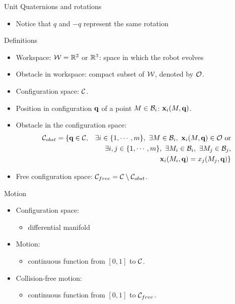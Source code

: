 %
%
\begin {frame} {Unit Quaternions and rotations}
  \begin{itemize}
    \item Notice that $q$ and $-q$ represent the same rotation
  \end{itemize}
\end{frame}

%
%

\begin{frame} {Definitions}

\begin{itemize}
\item Workspace: ${\cal W}=\mathbb{R}^2$ or $\mathbb{R}^3$: space in which the robot evolves
\pause
\item Obstacle in workspace: compact subset of ${\cal W}$, denoted by ${\cal O}$.
\pause
\item Configuration space: ${\cal C}$.
\pause
\item Position in configuration $\textbf{q}$ of a point $M\in{\cal B}_i$:
  $\textbf{x}_i(M,\textbf{q})$.
\pause
\item Obstacle in the configuration space:
\begin{eqnarray*}
{\cal C}_{obst}&=\{\textbf{q}\in{\cal C},&\exists i\in\{1,\cdots,m\},\ \exists M\in{\cal B}_i,\ \textbf{x}_i(M,\textbf{q})\in{\cal O}\ \mbox{or}\\
&&\exists i,j\in\{1,\cdots,m\},\ \exists M_i\in{\cal B}_i,\ \exists M_j\in{\cal B}_j,\\
&&\textbf{x}_i(M_i,\textbf{q})=x_j(M_j,\textbf{q})\}
\end{eqnarray*}
\pause
\item Free configuration space: ${\cal C}_{free} = {\cal C}\setminus{\cal C}_{obst}$.
\end{itemize}
\end{frame}

%
%

\begin{frame} {Motion}

\begin{itemize}
\item Configuration space:
  \begin{itemize}
  \item differential manifold
  \end{itemize}
  \pause
\item Motion:
  \begin{itemize}
  \item continuous function from $[0,1]$ to ${\cal C}$.
  \end{itemize}
  \pause
\item Collision-free motion:
  \begin{itemize}
  \item continuous function from $[0,1]$ to ${\cal C}_{free}$.
  \end{itemize}
\end{itemize}
\end{frame}

